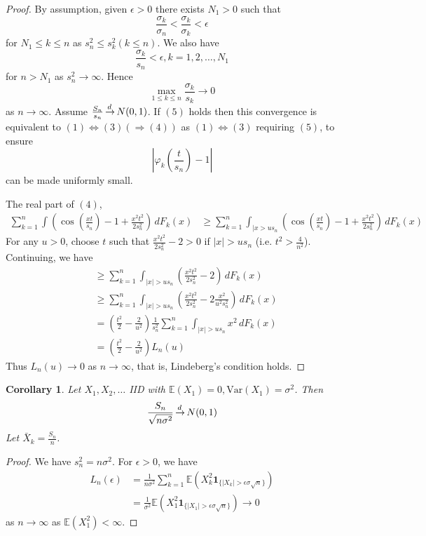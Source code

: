 \documentclass[10pt, oneside, reqno]{amsart}
\theoremstyle{plain}%
\newtheorem{cor}[thm]{Corollary}
\theoremstyle{definition}
\theoremstyle{remark}
\newcommand{\var}{\text{Var}}
\renewcommand{\phi}{\varphi}
\newcommand{\E}{\mathbb{E}}
\def\cid{\,{\buildrel \!d \over \rightarrow}\,}
\newcommand{\indic}[1]{\mathbf{1}_{\{ #1 \}} }
\begin{document}
\begin{proof}
	By assumption, given $\epsilon > 0$ there exists $N_1 > 0$ such that \[
		\frac{\sigma_k}{\sigma_n} < \frac{\sigma_k}{\sigma_k} < \epsilon
	\] for $N_1 \leq k \leq n$ as $s_n^2 \leq s_k^2 (k \leq n)$.  We also have \[
		\frac{\sigma_k}{s_n} < \epsilon, k = 1, 2, \dots, N_1
	\] for $n > N_1$ as $s_n^2 \rightarrow \infty$.  Hence \[
		\max_{1 \leq k \leq n} \frac{\sigma_k}{s_k} \rightarrow 0
	\] as $n \rightarrow \infty$.  Assume $\frac{S_n}{s_n} \cid N(0, 1)$.  If $(5)$ holds then this convergence is equivalent to $(1) \iff (3) ( \Rightarrow (4))$ as $(1) \iff (3)$ requiring $(5)$, to ensure \[
		\left|\phi_{k}(\frac{t}{s_n}) - 1 \right|
	\]  can be made uniformly small.  
	
	The real part of $(4)$, \begin{align*}
		\sum_{k=1}^n \int \left( \cos(\frac{xt}{s_n}) - 1 + \frac{x^2 t^2}{2s_n^2} \right) \, dF_k(x)
		&\geq \sum_{k=1}^n \int_{|x > u s_n} \left( \cos(\frac{xt}{s_n}) - 1 + \frac{x^2 t^2}{2s_n^2} \right) \, dF_k(x)
	\end{align*}  For any $u > 0$, choose $t$ such that $\frac{x^2 t^2}{2 s_n^2} - 2 > 0$ if $|x| > u s_n$ (i.e. $t^2 > \frac{4}{n^2}$).  Continuing, we have \begin{align*}
		&\geq \sum_{k=1}^n \int_{|x| > u s_n} \left( \frac{x^2 t^2}{2 s_n^2} - 2 \right) \, dF_k(x) \\
		&\geq \sum_{k=1}^n \int_{|x| > u s_n} \left(\frac{x^2 t^2}{2s_n^2} - 2\frac{x^2}{u^2 s_n^2} \right) \, dF_k(x) \\
		&= \left(\frac{t^2}{2} - \frac{2}{u^2}\right) \frac{1}{s_n^2} \sum_{k=1}^n \int_{|x| > u s_n} x^2 \, dF_k(x) \\
		&= \left(\frac{t^2}{2} - \frac{2}{u^2}\right) L_n(u)
	\end{align*} Thus $L_n(u) \rightarrow 0$ as $n \rightarrow \infty$, that is, Lindeberg's condition holds.
\end{proof}

\begin{cor}
	Let $X_1, X_2, \dots$ IID with $\E(X_1) = 0, \var(X_1) = \sigma^2$.  Then \[
		\frac{S_n}{\sqrt{n \sigma^2}} \cid N(0, 1)
	\] Let $\bar X_k = \frac{S_n}{n}$.
\end{cor}

\begin{proof}
	 We have $s_n^2 = n \sigma^2$.  For $\epsilon > 0$, we have \begin{align*}
		L_n(\epsilon) &= \frac{1}{n \sigma^2} \sum_{k=1}^n \E( X_k^2 \indic{|X_k| > \epsilon \sigma \sqrt{n}}) \\
		&= \frac{1}{\sigma^2} \E(X_1^2 \indic{|X_1| > \epsilon \sigma \sqrt{n}}) \rightarrow 0
	\end{align*} as $n \rightarrow \infty$ as $\E(X_1^2) < \infty$.
\end{proof}
\end{document}
